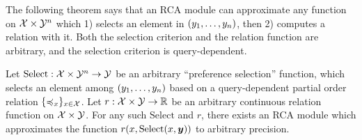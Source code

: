 The following theorem says that an RCA module can approximate any function on ${\mathcal{X}} \times {\mathcal{Y}}^n$ which 1) selects an element in $(y_1, \ldots, y_n)$, then 2) computes a relation with it. Both the selection criterion and the relation function are arbitrary, and the selection criterion is query-dependent.
\begin{theorem}[Informal]
  Let $\mathrm{Select}: {\mathcal{X}} \times {\mathcal{Y}}^n \to {\mathcal{Y}}$ be an arbitrary ``preference selection'' function, which selects an element among $(y_1, \ldots, y_n)$ based on a query-dependent partial order relation $\{\preccurlyeq_x\}_{x \in {\mathcal{X}}}$. Let $r: {\mathcal{X}} \times {\mathcal{Y}} \to \mathbb{R}$ be an arbitrary continuous relation function on ${\mathcal{X}} \times {\mathcal{Y}}$. For any such $\mathrm{Select}$ and $r$, there exists an RCA module which approximates the function $r(x, \mathrm{Select}(x, \bm{y}))$ to arbitrary precision.
\end{theorem}